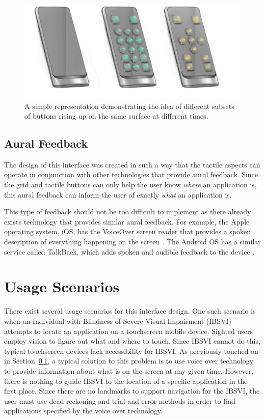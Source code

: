 \documentclass[11pt]{article}
\begin{document}
\begin{figure}[ht]
\centering
\includegraphics[width=6in]{buttons.png}
\caption{A simple representation demonstrating the idea of different subsets of buttons rising up on the same surface at different times.}
\label{buttons}
\end{figure}

\subsection{Aural Feedback}
\label{aural-feedback}
The design of this interface was created in such a way that the tactile aspects can operate in conjunction with other technologies that provide aural feedback. Since the grid and tactile buttons can only help the user know \textit{where} an application is, this aural feedback can inform the user of exactly \textit{what} an application is.

This type of feedback should not be too difficult to implement as there already exists technology that provides similar aural feedback. For example, the Apple operating system, iOS, has the VoiceOver screen reader that provides a spoken description of everything happening on the screen \cite{VoiceOver}. The Android OS has a similar service called TalkBack, which adds spoken and audible feedback to the device \cite{TalkBack}.


\section{Usage Scenarios}
There exist several usage scenarios for this interface design. One such scenario is when an Individual with Blindness of Severe Visual Impairment (IBSVI) attempts to locate an application on a touchscreen mobile device. Sighted users employ vision to figure out what and where to touch. Since IBSVI cannot do this, typical touchscreen devices lack accessibility for IBSVI. As previously touched on in Section~\ref{aural-feedback}, a typical solution to this problem is to use voice over technology to provide information about what is on the screen at any given time. However, there is nothing to guide IBSVI to the location of a specific application in the first place. Since there are no landmarks to support navigation for the IBSVI, the user must use dead-reckoning and trial-and-error methods in order to find applications specified by the voice over technology. 
\end{document}
